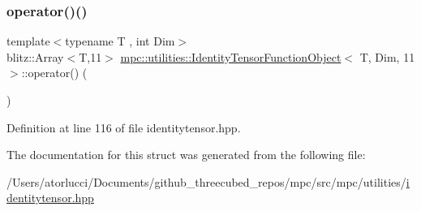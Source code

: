 \subsubsection{\texorpdfstring{operator()()}{operator()()}}
{\footnotesize\ttfamily template$<$typename T , int Dim$>$ \\
blitz\+::\+Array$<$T,11$>$ \mbox{\hyperlink{structmpc_1_1utilities_1_1_identity_tensor_function_object}{mpc\+::utilities\+::\+Identity\+Tensor\+Function\+Object}}$<$ T, Dim, 11 $>$\+::operator() (\begin{DoxyParamCaption}{ }\end{DoxyParamCaption})\hspace{0.3cm}{\ttfamily [inline]}}



Definition at line 116 of file identitytensor.\+hpp.



The documentation for this struct was generated from the following file\+:\begin{DoxyCompactItemize}
\item 
/\+Users/atorlucci/\+Documents/github\+\_\+threecubed\+\_\+repos/mpc/src/mpc/utilities/\mbox{\hyperlink{identitytensor_8hpp}{identitytensor.\+hpp}}\end{DoxyCompactItemize}
